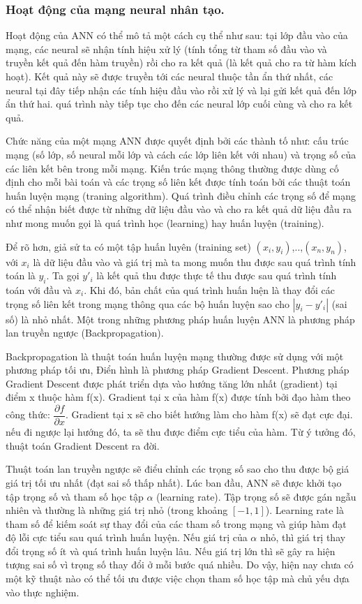 \subsubsection{Hoạt động của mạng neural nhân tạo.}
	Hoạt động của ANN có thể mô tả một cách cụ thể như sau: tại lớp đầu vào của mạng, các neural sẽ nhận tính hiệu xử lý (tính tổng từ tham số đầu vào và truyền kết quả đến hàm truyền) rồi cho ra kết quả (là kết quả cho ra từ hàm kích hoạt). Kết quả này sẽ được truyền tới các neural thuộc tần ẩn thứ nhất, các neural tại đây tiếp nhận các tính hiệu đầu vào rồi xử lý và lại gửi kết quả đến lớp ẩn thứ hai. quá trình này tiếp tục cho đến các neural lớp cuối cùng và cho ra kết quả.\par
	Chức năng của một mạng ANN được quyết định bởi các thành tố như: cấu trúc mạng (số lớp, số neural mỗi lớp và cách các lớp liên kết với nhau) và trọng số của các liên kết bên trong mỗi mạng. Kiến trúc mạng thông thường được dùng cố định cho mỗi bài toán và các trọng số liên kết được tính toán bởi các thuật toán huấn luyện mạng (traning algorithm). Quá trình điều chỉnh các trọng số để mạng có thể nhận biết được từ những dữ liệu đầu vào và cho ra kết quả dữ liệu đầu ra như mong muốn gọi là quá trình học (learning) hay huấn luyện (training).\par
	Để rõ hơn, giả sử ta có một tập huấn luyên (training set) $(x_{i},y_{i})$,..,$(x_{n},y_{n})$, với $x_{i}$ là dữ liệu đầu vào và giá trị mà ta mong muốn thu được sau quá trình tính toán là $y_{i}$. Ta gọi $y'_{i}$ là kết quả thu được thực tế thu được sau quá trình tính toán với đầu và $x_{i}$. Khi đó, bản chất của quá trình huấn luện là thay đổi các trọng số liên kết trong mạng thông qua các bộ huấn luyện sao cho $|y_{i} - y'_{i}|$ (sai số) là nhỏ nhất. Một trong những phương pháp huấn luyện ANN là phương pháp lan truyền ngược (Backpropagation). \par
	Backpropagation là thuật toán huấn luyện mạng thường được sử dụng với một phương pháp tối ưu, Điển hình là phương pháp Gradient  Descent. Phương pháp Gradient Descent được phát triển dựa vào hướng tăng lớn nhất (gradient) tại điểm x thuộc hàm f(x). Gradient tại x của hàm f(x) được tính bởi đạo hàm theo công thức: $\dfrac{\partial{f}}{\partial{x}}$. Gradient tại x sẽ cho biết hướng làm cho hàm f(x) sẽ đạt cực đại. nếu đi ngược lại hướng đó, ta sẽ thu được điểm cực tiểu của hàm. Từ ý tưởng đó, thuật toán Gradient Descent ra đời. \par
	Thuật toán lan truyền ngược sẽ điểu chỉnh các trọng số sao cho thu được bộ giá giá trị tối ưu nhất (đạt sai số thấp nhất). Lúc ban đầu, ANN sẽ được khởi tạo tập trọng số và tham số học tập $ \alpha $ (learning rate). Tập trọng số sẽ được gán ngẫu nhiên và thường là những giá trị nhỏ (trong khoảng $[-1,1]$). Learning rate là tham số để kiếm soát sự thay đổi của các tham số trong mạng và giúp hàm đạt độ lỗi cực tiểu sau quá trình huấn luyện. Nếu giá trị của $\alpha$ nhỏ, thì giá trị thay đổi trọng số ít và quá trình huấn luyện lâu. Nếu giá trị lớn thì sẽ gây ra hiện tượng sai số vì trọng số thay đổi ở mỗi bước quá nhiều. Do vậy, hiện nay chưa có một kỹ thuật nào có thể tối ưu được việc chọn tham số học tập mà chủ yếu dựa vào thực nghiệm. \par   	

